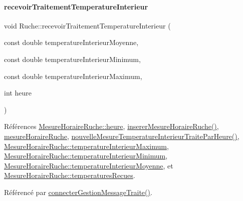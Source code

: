 \paragraph{\texorpdfstring{recevoir\+Traitement\+Temperature\+Interieur}{recevoirTraitementTemperatureInterieur}}
{\footnotesize\ttfamily void Ruche\+::recevoir\+Traitement\+Temperature\+Interieur (\begin{DoxyParamCaption}\item[{const double}]{temperature\+Interieur\+Moyenne,  }\item[{const double}]{temperature\+Interieur\+Minimum,  }\item[{const double}]{temperature\+Interieur\+Maximum,  }\item[{int}]{heure }\end{DoxyParamCaption})\hspace{0.3cm}{\ttfamily [slot]}}



Références \hyperlink{struct_mesure_horaire_ruche_ab679cc7168deb6c3d2458c99b94e0611}{Mesure\+Horaire\+Ruche\+::heure}, \hyperlink{class_ruche_a3a093c088d9c97f347394c8a681f7302}{inserer\+Mesure\+Horaire\+Ruche()}, \hyperlink{class_ruche_a9a68d3b7eb272e139f1532fdcbca2da3}{mesure\+Horaire\+Ruche}, \hyperlink{class_ruche_a5fdf12cb02acc7283f183a7aad906edc}{nouvelle\+Mesure\+Temperature\+Interieur\+Traite\+Par\+Heure()}, \hyperlink{struct_mesure_horaire_ruche_a746c391a70735bfff63bf7271ab28ab8}{Mesure\+Horaire\+Ruche\+::temperature\+Interieur\+Maximum}, \hyperlink{struct_mesure_horaire_ruche_a51c45378a78c733704df79b38d61afcc}{Mesure\+Horaire\+Ruche\+::temperature\+Interieur\+Minimum}, \hyperlink{struct_mesure_horaire_ruche_ac240bf701116e1a09f2bf33911bf57ef}{Mesure\+Horaire\+Ruche\+::temperature\+Interieur\+Moyenne}, et \hyperlink{struct_mesure_horaire_ruche_ade9984cb0f2c62b3ba1369f77249bb4a}{Mesure\+Horaire\+Ruche\+::temperatures\+Recues}.



Référencé par \hyperlink{class_ruche_a20ec8c6dc931218e5cf682050fe845d9}{connecter\+Gestion\+Message\+Traite()}.



